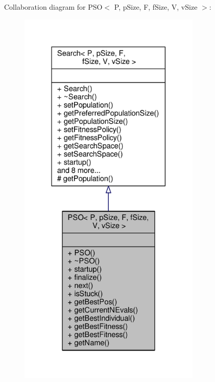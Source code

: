 Collaboration diagram for P\+SO$<$ P, p\+Size, F, f\+Size, V, v\+Size $>$\+:\nopagebreak
\begin{figure}[H]
\begin{center}
\leavevmode
\includegraphics[width=247pt]{classPSO__coll__graph}
\end{center}
\end{figure}
